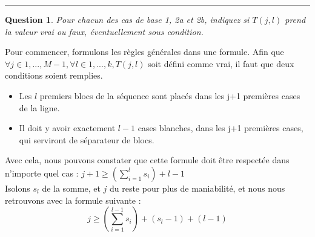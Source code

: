 \documentclass[a4paper,12pt]{article}
\newtheorem{exo}{Question}
\begin{document}
\noindent\rule{\textwidth}{1pt}


\begin{exo}
	Pour chacun des cas de base 1, 2a et 2b, indiquez si $T(j,l)$ prend la valeur vrai ou faux, éventuellement sous condition.
\end{exo}

Pour commencer, formulons les règles générales dans une formule. Afin que $\forall j \in {1,...,M-1}, \forall l \in {1,...,k}, T(j,l)$ soit défini comme vrai, il faut que deux conditions soient remplies.
\begin{itemize}
	\item Les $l$ premiers blocs de la séquence sont placés dans les j+1 premières cases de la ligne.
	\item Il doit y avoir exactement $l-1$ cases blanches, dans les j+1 premières cases, qui serviront de séparateur de blocs.\\
\end{itemize}

Avec cela, nous pouvons constater que cette formule doit être respectée dans n'importe quel cas : $j+1 \geq (\sum_{i=1}^{l} s_i) + l - 1$\\
Isolons $s_l$ de la somme, et $j$ du reste pour plus de maniabilité, et nous nous retrouvons avec la formule suivante :
$$j \geq (\sum_{i=1}^{l-1} s_i) + (s_l - 1) + (l-1)$$
\end{document}
